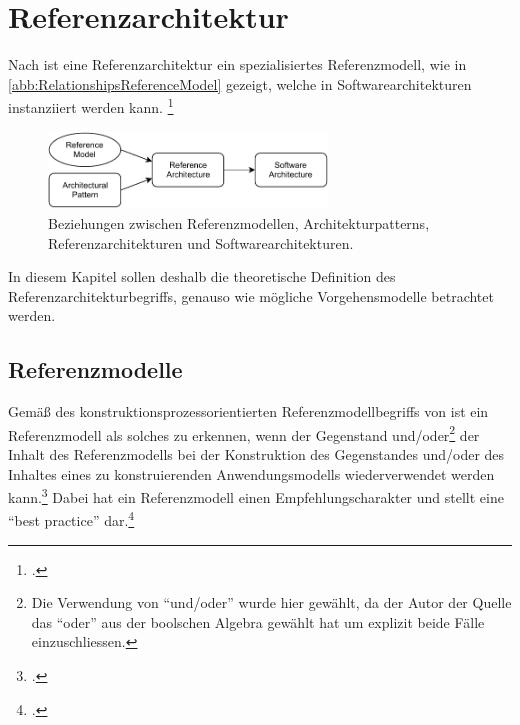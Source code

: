 \section{Referenzarchitektur}\label{theorie:referenzmodellierung}
Nach \citeauthor{Bass.2010} ist eine Referenzarchitektur ein spezialisiertes Referenzmodell, wie in \autoref{abb:RelationshipsReferenceModel} gezeigt, welche in Softwarearchitekturen instanziiert werden kann. \footcite[Vgl.][S.~17~f.]{Bass.2010} 

\begin{figure}[H]
\centering
\includegraphics[width=0.66\textwidth]{graphics/Relationships-reference-models.pdf}
\caption[Beziehungen zwischen Referenzmodellen, Architekturpatterns, Referenzarchitekturen und Softwarearchitekturen]{Beziehungen zwischen Referenzmodellen, Architekturpatterns, Referenzarchitekturen und Softwarearchitekturen.\footnotemark}
\label{abb:RelationshipsReferenceModel}
\end{figure}

In diesem Kapitel sollen deshalb die theoretische Definition des Referenzarchitekturbegriffs, genauso wie mögliche Vorgehensmodelle betrachtet werden.



\subsection{Referenzmodelle}

Gemäß des konstruktionsprozessorientierten Referenzmodellbegriffs von \citeauthor{vomBrocke.2003} ist ein Referenzmodell als solches zu erkennen, wenn der Gegenstand und/oder\footnote{Die Verwendung von \enquote{und/oder} wurde hier gewählt, da der Autor der Quelle das \enquote{oder} aus der boolschen Algebra gewählt hat um explizit beide Fälle einzuschliessen.} der Inhalt des Referenzmodells bei der Konstruktion des Gegenstandes und/oder des Inhaltes eines zu konstruierenden Anwendungsmodells wiederverwendet werden kann.\footcite[Vgl.][34]{vomBrocke.2003} Dabei hat ein Referenzmodell einen Empfehlungscharakter und stellt eine \enquote{best practice} dar.\footcite[Vgl.][31]{vomBrocke.2003} 

